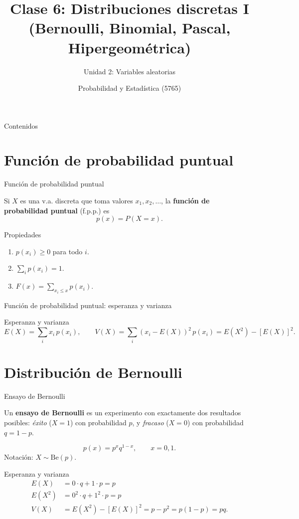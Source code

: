 \documentclass[aspectratio=169,11pt]{beamer}
\title[Prob. y Estadística]{Clase 6: Distribuciones discretas I (Bernoulli, Binomial, Pascal, Hipergeométrica)}
\subtitle{Unidad 2: Variables aleatorias}
\institute[UNS]{Universidad Nacional del Sur \\ Departamento de Matemática}
\author{Probabilidad y Estadística (5765)}
\date{}
\begin{document}
\begin{frame}
\titlepage
\end{frame}

\begin{frame}{Contenidos}
\tableofcontents
\end{frame}

\section{Función de probabilidad puntual}

\begin{frame}{Función de probabilidad puntual}
\begin{definition}
Si $X$ es una v.a. discreta que toma valores $x_1,x_2,\dots$, la \textbf{función de probabilidad puntual} (f.p.p.) es
$$p(x) = P(X=x).$$
\end{definition}

\begin{block}{Propiedades}
\begin{enumerate}
\item $p(x_i) \ge 0$ para todo $i$.
\item $\displaystyle\sum_i p(x_i) = 1$.
\item $F(x) = \displaystyle\sum_{x_i \le x} p(x_i)$.
\end{enumerate}
\end{block}
\end{frame}

\begin{frame}{Función de probabilidad puntual: esperanza y varianza}
\begin{block}{Esperanza y varianza}
$$E(X) = \sum_i x_i\, p(x_i), \qquad V(X) = \sum_i (x_i-E(X))^2\, p(x_i) = E(X^2)-[E(X)]^2.$$
\end{block}
\end{frame}

\section{Distribución de Bernoulli}

\begin{frame}{Ensayo de Bernoulli}
\begin{definition}
Un \textbf{ensayo de Bernoulli} es un experimento con exactamente dos resultados posibles: \emph{éxito} ($X=1$) con probabilidad $p$, y \emph{fracaso} ($X=0$) con probabilidad $q=1-p$.

$$p(x) = p^x q^{1-x}, \qquad x=0,1.$$
Notación: $X \sim \text{Be}(p)$.
\end{definition}

\begin{block}{Esperanza y varianza}
\begin{align*}
E(X) &= 0\cdot q + 1 \cdot p = p \\
E(X^2) &= 0^2\cdot q + 1^2\cdot p = p \\
V(X) &= E(X^2)-[E(X)]^2 = p - p^2 = p(1-p) = pq.
\end{align*}
\end{block}
\end{frame}
\end{document}
